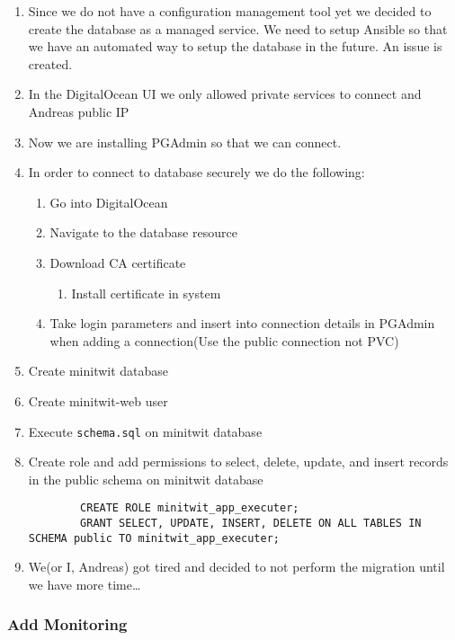 \begin{enumerate}
    \item Since we do not have a configuration management tool yet we decided to create the database as a managed service. We need to setup Ansible so that we have an automated way to setup the database in the future. An issue is created.
    \item In the DigitalOcean UI we only allowed private services to connect and Andreas public IP
    \item Now we are installing PGAdmin so that we can connect.
    \item In order to connect to database securely we do the following:

    \begin{enumerate}
        \item Go into DigitalOcean
        \item Navigate to the database resource
        \item Download CA certificate
        \begin{enumerate}
            \item Install certificate in system
        \end{enumerate}

        \item Take login parameters and insert into connection details in PGAdmin when adding a connection(Use the public connection not PVC)
    \end{enumerate}
    \item Create minitwit database
    \item Create minitwit-web user
    \item Execute \texttt{schema.sql} on minitwit database
    \item Create role and add permissions to select, delete, update, and insert records in the public schema on minitwit database

    \begin{verbatim}
        CREATE ROLE minitwit_app_executer;
        GRANT SELECT, UPDATE, INSERT, DELETE ON ALL TABLES IN SCHEMA public TO minitwit_app_executer;
    \end{verbatim}
    \item We(or I, Andreas) got tired and decided to not perform the migration until we have more time\ldots{}
\end{enumerate}

\subsubsection{Add Monitoring}
\label{log:add-monitoring}

